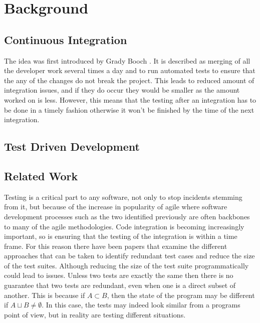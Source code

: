 \chapter{Background}\label{C:related}

\section{Continuous Integration}

The idea was first introduced by Grady Booch \cite{booch2006object}. It is described as merging of all the developer work several times a day and to run automated tests to ensure that the any of the changes do not break the project. This leads to reduced amount of integration issues, and if they do occur they would be smaller as the amount worked on is less. However, this means that the testing after an integration has to be done in a timely fashion otherwise it won’t be finished by the time of the next integration.

\section{Test Driven Development}

\section{Related Work}

Testing is a critical part to any software, not only to stop incidents stemming from it, but because of the increase in popularity of agile \cite{chaos} where software development processes such as the two identified previously are often backbones to many of the agile methodologies. Code integration is becoming increasingly important, so is ensuring that the testing of the integration is within a time frame. For this reason there have been papers that examine the different approaches that can be taken to identify redundant test cases and reduce the size of the test suites. Although reducing the size of the test suite programmatically could lead to issues. Unless two tests are exactly the same then there is no guarantee that two tests are redundant, even when one is a direct subset of another. This is because if $A \subset B$, then the state of the program may be different if $A \sqcup B \ne  \emptyset $. In this case, the tests may indeed look similar from a programs point of view, but in reality are testing different situations.


